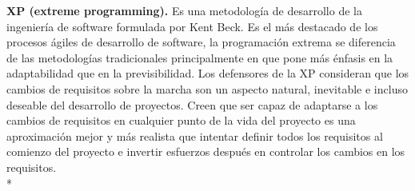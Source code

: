 \documentclass[../pfc.tex]{subfiles}
\begin{document}
	\textbf{XP (extreme programming).}
	 Es una metodología de desarrollo de la ingeniería de software formulada por Kent Beck.
	 Es el más destacado de los procesos ágiles de desarrollo de software, la programación extrema se diferencia de las metodologías tradicionales principalmente en que pone más énfasis en la adaptabilidad que en la previsibilidad. Los defensores de la XP consideran que los cambios de requisitos sobre la marcha son un aspecto natural, inevitable e incluso deseable del desarrollo de proyectos. Creen que ser capaz de adaptarse a los cambios de requisitos en cualquier punto de la vida del proyecto es una aproximación mejor y más realista que intentar definir todos los requisitos al comienzo del proyecto e invertir esfuerzos después en controlar los cambios en los requisitos.\\*
	
\end{document}
